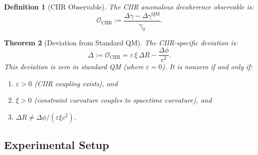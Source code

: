 \documentclass[11pt,a4paper]{article}
\newtheorem{definition}{Definition}[section]
\newtheorem{theorem}[definition]{Theorem}
\theoremstyle{remark}
\begin{document}
\begin{definition}[CIIR Observable]
\label{def:observable}
The \emph{CIIR anomalous decoherence observable} is:
\begin{equation}
\label{eq:observable}
  \mathcal{O}_{\mathrm{CIIR}} :=
    \frac{\Delta\gamma - \Delta\gamma^{\mathrm{QM}}}{\gamma_0}.
\end{equation}
\end{definition}

\begin{theorem}[Deviation from Standard QM]
\label{thm:deviation}
The CIIR-specific deviation is:
\begin{equation}
\label{eq:deviation}
  \boxed{
    \Delta := \mathcal{O}_{\mathrm{CIIR}}
    = \varepsilon \, \xi \, \Delta R
    - \frac{\Delta\phi}{c^2}.
  }
\end{equation}
This deviation is \emph{zero} in standard QM (where $\varepsilon = 0$).
It is nonzero if and only if:
\begin{enumerate}[label=(\roman*)]
  \item $\varepsilon > 0$ (CIIR coupling exists), and
  \item $\xi > 0$ (constraint curvature couples to spacetime curvature),
    and
  \item $\Delta R \neq \Delta\phi / (\varepsilon \xi c^2)$.
\end{enumerate}
\end{theorem}

\subsection{Experimental Setup}
\end{document}
